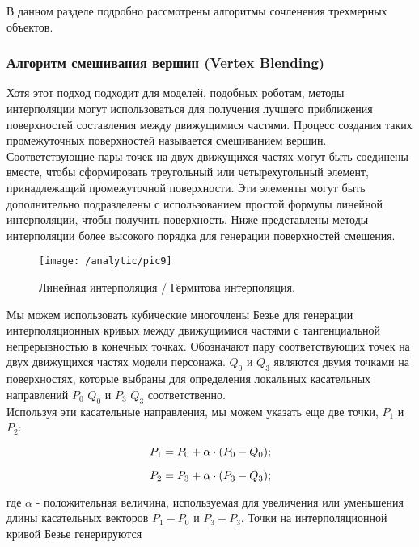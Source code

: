 В данном разделе подробно рассмотрены алгоритмы сочленения трехмерных объектов.

\subsubsection{Алгоритм смешивания вершин (Vertex Blending)}\label{subsec:analytic1.3.1}

Хотя этот подход подходит для моделей, подобных роботам, методы интерполяции могут использоваться для получения лучшего приближения поверхностей составления между движущимися частями. Процесс создания таких промежуточных поверхностей называется смешиванием вершин.\\

Соответствующие пары точек на двух движущихся частях могут быть соединены вместе, чтобы сформировать треугольный или четырехугольный элемент, принадлежащий промежуточной поверхности. Эти элементы могут быть дополнительно подразделены с использованием простой формулы линейной интерполяции, чтобы получить поверхность. Ниже представлены методы интерполяции более высокого порядка для генерации поверхностей смешения.

\begin{figure}[H]
\center
\texttt{[image: /analytic/pic9]}
\caption{Линейная интерполяция / Гермитова интерполяция.}
\end{figure}

Мы можем использовать кубические многочлены Безье для генерации интерполяционных кривых между движущимися частями с тангенциальной непрерывностью в конечных точках. Обозначают пару соответствующих точек на двух движущихся частях модели персонажа. $Q_{0}$ и $Q_{3}$ являются двумя точками на поверхностях, которые выбраны для определения локальных касательных направлений $P_{0}$ $Q_{0}$ и $P_{3}$ $Q_{3}$ соответственно.\\

Используя эти касательные направления, мы можем указать еще две точки, $P_{1}$ и $P_{2}$:

\begin{equation}
    P_{1} = P_{0} + \alpha \cdot (P_{0} - Q_{0}); \notag
\end{equation}

\begin{equation}
    P_{2} = P_{3} + \alpha \cdot (P_{3} - Q_{3}); \notag
\end{equation}

где $\alpha$ - положительная величина, используемая для увеличения или уменьшения длины касательных векторов $P_{1}-P_{0}$ и $P_{3}-P_{3}$. Точки на интерполяционной кривой Безье генерируются

